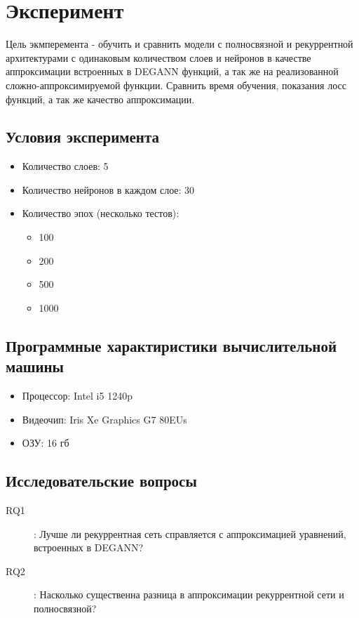 
\section{Эксперимент}
Цель экмперемента - обучить и сравнить модели с полносвязной и рекуррентной архитектурами с одинаковым количеством слоев и нейронов в качестве аппроксимации встроенных в DEGANN функций, а так же на реализованной сложно-аппроксимируемой функции. Сравнить время обучения, показания лосс функций, а так же качество аппроксимации.

\subsection{Условия эксперимента}
\begin{itemize}
    \item Количество слоев: 5
    \item Количество нейронов в каждом слое: 30
    \item Количество эпох (несколько тестов):
    \begin{itemize}
        \item 100
        \item 200
        \item 500
        \item 1000
    \end{itemize}
\end{itemize}
\subsection{Программные характиристики вычислительной машины}
\begin{itemize}
    \item Процессор: Intel i5 1240p
    \item Видеочип: Iris Xe Graphics G7 80EUs
    \item ОЗУ: 16 гб
\end{itemize}

\subsection{Исследовательские вопросы}
\begin{description}
    \item[RQ1]: Лучше ли рекуррентная  сеть справляется с аппроксимацией уравнений, встроенных в DEGANN?
    \item[RQ2]: Насколько существенна разница в аппроксимации рекуррентной  сети и полносвязной?
\end{description}

